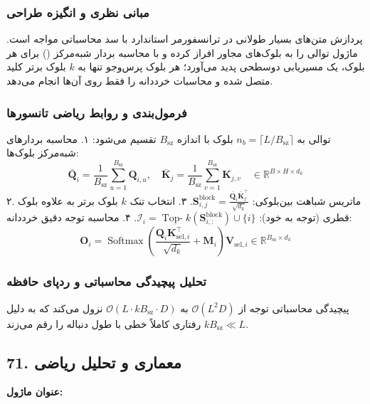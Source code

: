 \subsubsection*{مبانی نظری و انگیزه طراحی}
پردازش متن‌های بسیار طولانی در ترانسفورمر استاندارد با سد محاسباتی مواجه است. ماژول  توالی را به بلوک‌های مجاور افراز کرده و با محاسبه بردار شبه‌مرکز () برای هر بلوک، یک مسیریابی دوسطحی پدید می‌آورد؛ هر بلوک پرس‌وجو تنها به $k$ بلوک برتر کلید متصل شده و محاسبات خرد‌دانه را فقط روی آن‌ها انجام می‌دهد.

\subsubsection*{فرمول‌بندی و روابط ریاضی تانسورها}
توالی به $n_b = \lceil L / B_{\text{sz}} \rceil$ بلوک با اندازه $B_{\text{sz}}$ تقسیم می‌شود:
۱. محاسبه بردارهای شبه‌مرکز بلوک‌ها:
\begin{equation}
\bar{\mathbf{Q}}_i = \frac{1}{B_{\text{sz}}} \sum_{u=1}^{B_{\text{sz}}} \mathbf{Q}_{i, u}, \quad \bar{\mathbf{K}}_j = \frac{1}{B_{\text{sz}}} \sum_{v=1}^{B_{\text{sz}}} \mathbf{K}_{j, v} \quad \in \mathbb{R}^{B \times H \times d_k}
\end{equation}
۲. ماتریس شباهت بین‌بلوکی: $\mathbf{S}_{i, j}^{\text{block}} = \frac{\bar{\mathbf{Q}}_i \bar{\mathbf{K}}_j^\top}{\sqrt{d_k}}$.
۳. انتخاب تنک $k$ بلوک برتر به علاوه بلوک قطری (توجه به خود): $\mathcal{I}_i = \operatorname{Top-}k(\mathbf{S}_{i, :}^{\text{block}}) \cup \{i\}$.
۴. محاسبه توجه دقیق خرد‌دانه:
\begin{equation}
\mathbf{O}_i = \operatorname{Softmax}\left(\frac{\mathbf{Q}_i \mathbf{K}_{\text{sel}, i}^\top}{\sqrt{d_k}} + \mathbf{M}_i\right) \mathbf{V}_{\text{sel}, i} \in \mathbb{R}^{B_{\text{sz}} \times d_k}
\end{equation}

\subsubsection*{تحلیل پیچیدگی محاسباتی و ردپای حافظه}
پیچیدگی محاسباتی توجه از $\mathcal{O}(L^2 D)$ به $\mathcal{O}(L \cdot k B_{\text{sz}} \cdot D)$ نزول می‌کند که به دلیل $k B_{\text{sz}} \ll L$ رفتاری کاملاً خطی با طول دنباله را رقم می‌زند.


\subsection*{71. معماری و تحلیل ریاضی }
\textbf{عنوان ماژول:} 

